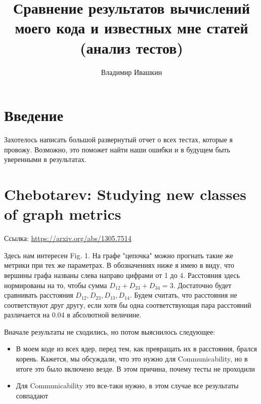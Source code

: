\documentclass{article}
\title{
	Сравнение результатов вычислений моего кода и известных мне статей (анализ тестов)
}
\author{Владимир Ивашкин}
\begin{document}
\maketitle

\section*{Введение}
Захотелось написать большой развернутый отчет о всех тестах, которые я провожу. Возможно, это поможет найти наши ошибки и в будущем быть уверенными в результатах.

\section{Chebotarev: Studying new classes of graph metrics}
Ссылка: \url{https://arxiv.org/abs/1305.7514}

Здесь нам интересен Fig. 1. На графе "цепочка" можно прогнать такие же метрики при тех же параметрах. В обозначениях ниже я имею в виду, что вершины графа названы слева направо цифрами от 1 до 4. Расстояния здесь нормированы на то, чтобы сумма $D_{12} + D_{23} + D_{34} = 3$.
Достаточно будет сравнивать расстояния $D_{12}, D_{23}, D_{13}, D_{14}$.
Будем считать, что расстояния не соответствуют друг другу, если хотя бы одна соответствующая пара расстояний различается на 0.04 в абсолютной величине.

Вначале результаты не сходились, но потом выяснилось следующее:
\begin{itemize}
  \item В моем коде из всех ядер, перед тем, как превращать их в расстояния, брался корень. Кажется, мы обсуждали, что это нужно для Communicability, но в итоге это было включено везде. В этом причина, почему тесты не проходили
  \item Для Communicability это все-таки нужно, в этом случае все результаты совпадают
\end{itemize}
\end{document}
